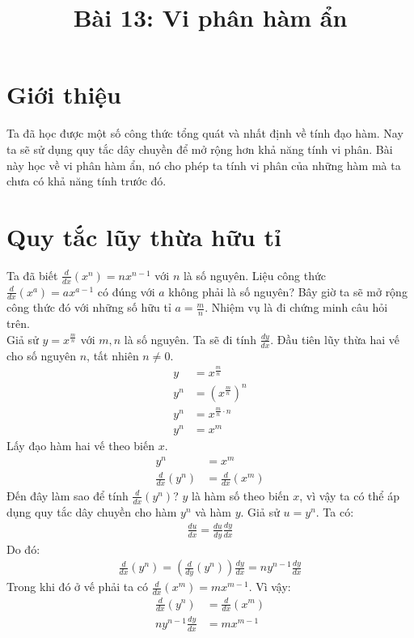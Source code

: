 \documentclass[15pt,a4paper]{article}
\begin{document}
\title{\textbf{Bài 13: Vi phân hàm ẩn}}
\author{}
\date{}
\maketitle

\section{Giới thiệu}
Ta đã học được một số công thức tổng quát và nhất định về tính đạo hàm. Nay ta sẽ sử dụng quy tắc dây chuyền để mở rộng hơn khả năng tính vi phân. Bài này học về vi phân hàm ẩn, nó cho phép ta tính vi phân của những hàm mà ta chưa có khả năng tính trước đó.
\section{Quy tắc lũy thừa hữu tỉ}
Ta đã biết $\frac{d}{dx}(x^n)= n x^{n-1}$ với $n$ là số nguyên. Liệu công thức $\frac{d}{dx}(x^a)= ax^{a-1}$ có đúng với $a$ không phải là số nguyên? Bây giờ ta sẽ mở rộng công thức đó với những số hữu tỉ $a = \frac{m}{n}$. Nhiệm vụ là đi chứng minh câu hỏi trên.\\
Giả sử $y = x^{\frac{m}{n}}$ với $m, n$ là số nguyên. Ta sẽ đi tính $\frac{dy}{dx}$. Đầu tiên lũy thừa hai vế cho số nguyên $n$, tất nhiên $n \neq 0$.
\begin{align*}
	y &= x^{\frac{m}{n}}\\
	y^n &= (x^{\frac{m}{n}})^n\\
	y^n &= x^{\frac{m}{n} \cdot n}\\
	y^n &= x^m
\end{align*}
Lấy đạo hàm hai vế theo biến $x$.
\begin{align*}
	y^n &= x^m\\
	\frac{d}{dx}(y^n) &= \frac{d}{dx}(x^m)
\end{align*}
Đến đây làm sao để tính $\frac{d}{dx}(y^n)$? $y$ là hàm số theo biến $x$, vì vậy ta có thể áp dụng quy tắc dây chuyền cho hàm $y^n$ và hàm $y$. Giả sử $u = y^n$. Ta có:
\begin{align*}
	\frac{du}{dx} = \frac{du}{dy} \frac{dy}{dx}
\end{align*}
Do đó:
\begin{align*}
	\frac{d}{dx}(y^n) = \left(\frac{d}{dy}(y^n)\right) \frac{dy}{dx} = n y^{n-1} \frac{dy}{dx}
\end{align*}
Trong khi đó ở vế phải ta có $\frac{d}{dx}(x^m) = m x^{m-1}$. Vì vậy:
\begin{align*}
	\frac{d}{dx}(y^n) &= \frac{d}{dx}(x^m)\\
	n y^{n-1} \frac{dy}{dx} &= m x^{m-1}
\end{align*}
\end{document}

